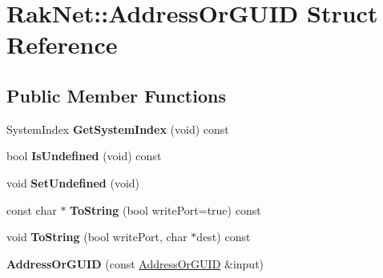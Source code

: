 \hypertarget{struct_rak_net_1_1_address_or_g_u_i_d}{\section{Rak\-Net\-:\-:Address\-Or\-G\-U\-I\-D Struct Reference}
\label{struct_rak_net_1_1_address_or_g_u_i_d}
}
\subsection*{Public Member Functions}
\begin{DoxyCompactItemize}
\item 
\hypertarget{struct_rak_net_1_1_address_or_g_u_i_d_a0706244415def118f09f308235def00e}{System\-Index {\bfseries Get\-System\-Index} (void) const }\label{struct_rak_net_1_1_address_or_g_u_i_d_a0706244415def118f09f308235def00e}

\item 
\hypertarget{struct_rak_net_1_1_address_or_g_u_i_d_ad6045d3c5694d52044062435f1783005}{bool {\bfseries Is\-Undefined} (void) const }\label{struct_rak_net_1_1_address_or_g_u_i_d_ad6045d3c5694d52044062435f1783005}

\item 
\hypertarget{struct_rak_net_1_1_address_or_g_u_i_d_a66499c0f8428c747a644aee1c2ad4a10}{void {\bfseries Set\-Undefined} (void)}\label{struct_rak_net_1_1_address_or_g_u_i_d_a66499c0f8428c747a644aee1c2ad4a10}

\item 
\hypertarget{struct_rak_net_1_1_address_or_g_u_i_d_a4ff34e178b3de4d9b366a4181324408e}{const char $\ast$ {\bfseries To\-String} (bool write\-Port=true) const }\label{struct_rak_net_1_1_address_or_g_u_i_d_a4ff34e178b3de4d9b366a4181324408e}

\item 
\hypertarget{struct_rak_net_1_1_address_or_g_u_i_d_a4b7cca62dca7e529b2576b6ae30eddbe}{void {\bfseries To\-String} (bool write\-Port, char $\ast$dest) const }\label{struct_rak_net_1_1_address_or_g_u_i_d_a4b7cca62dca7e529b2576b6ae30eddbe}

\item 
\hypertarget{struct_rak_net_1_1_address_or_g_u_i_d_ae03d65db5e2410bc9840c561ac52c284}{{\bfseries Address\-Or\-G\-U\-I\-D} (const \hyperlink{struct_rak_net_1_1_address_or_g_u_i_d}{Address\-Or\-G\-U\-I\-D} \&input)}\label{struct_rak_net_1_1_address_or_g_u_i_d_ae03d65db5e2410bc9840c561ac52c284}


\end{DoxyCompactItemize}
